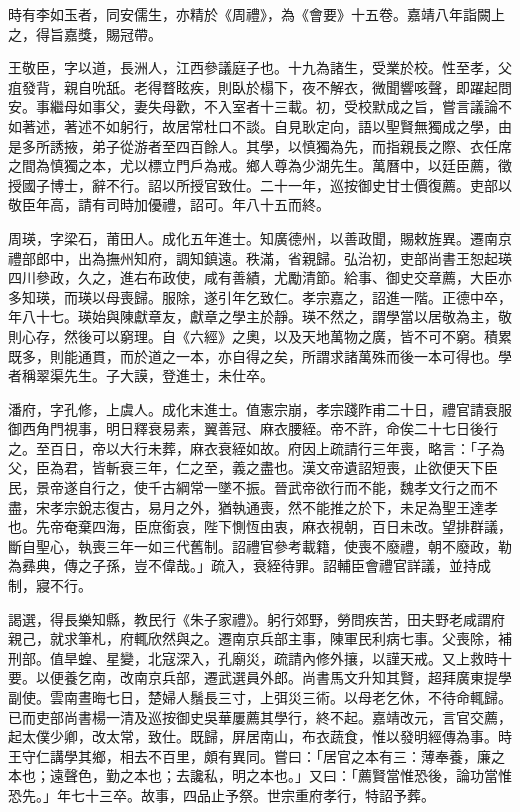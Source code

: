 \begin{pinyinscope}
時有李如玉者，同安儒生，亦精於《周禮》，為《會要》十五卷。嘉靖八年詣闕上之，得旨嘉獎，賜冠帶。

王敬臣，字以道，長洲人，江西參議庭子也。十九為諸生，受業於校。性至孝，父疽發背，親自吮舐。老得瞀眩疾，則臥於榻下，夜不解衣，微聞響咳聲，即躍起問安。事繼母如事父，妻失母歡，不入室者十三載。初，受校默成之旨，嘗言議論不如著述，著述不如躬行，故居常杜口不談。自見耿定向，語以聖賢無獨成之學，由是多所誘掖，弟子從游者至四百餘人。其學，以慎獨為先，而指親長之際、衣任席之間為慎獨之本，尤以標立門戶為戒。鄉人尊為少湖先生。萬曆中，以廷臣薦，徵授國子博士，辭不行。詔以所授官致仕。二十一年，巡按御史甘士價復薦。吏部以敬臣年高，請有司時加優禮，詔可。年八十五而終。

周瑛，字梁石，莆田人。成化五年進士。知廣德州，以善政聞，賜敕旌異。遷南京禮部郎中，出為撫州知府，調知鎮遠。秩滿，省親歸。弘治初，吏部尚書王恕起瑛四川參政，久之，進右布政使，咸有善績，尤勵清節。給事、御史交章薦，大臣亦多知瑛，而瑛以母喪歸。服除，遂引年乞致仁。孝宗嘉之，詔進一階。正德中卒，年八十七。瑛始與陳獻章友，獻章之學主於靜。瑛不然之，謂學當以居敬為主，敬則心存，然後可以窮理。自《六經》之奧，以及天地萬物之廣，皆不可不窮。積累既多，則能通貫，而於道之一本，亦自得之矣，所謂求諸萬殊而後一本可得也。學者稱翠渠先生。子大謨，登進士，未仕卒。

潘府，字孔修，上虞人。成化末進士。值憲宗崩，孝宗踐阼甫二十日，禮官請衰服御西角門視事，明日釋衰易素，翼善冠、麻衣腰絰。帝不許，命俟二十七日後行之。至百日，帝以大行未葬，麻衣衰絰如故。府因上疏請行三年喪，略言：「子為父，臣為君，皆斬衰三年，仁之至，義之盡也。漢文帝遺詔短喪，止欲便天下臣民，景帝遂自行之，使千古綱常一墜不振。晉武帝欲行而不能，魏孝文行之而不盡，宋孝宗銳志復古，易月之外，猶執通喪，然不能推之於下，未足為聖王達孝也。先帝奄棄四海，臣庶銜哀，陛下惻恆由衷，麻衣視朝，百日未改。望排群議，斷自聖心，執喪三年一如三代舊制。詔禮官參考載籍，使喪不廢禮，朝不廢政，勒為彞典，傳之子孫，豈不偉哉。」疏入，衰絰待罪。詔輔臣會禮官詳議，並持成制，寢不行。

謁選，得長樂知縣，教民行《朱子家禮》。躬行郊野，勞問疾苦，田夫野老咸謂府親己，就求筆札，府輒欣然與之。遷南京兵部主事，陳軍民利病七事。父喪除，補刑部。值旱蝗、星變，北寇深入，孔廟災，疏請內修外攘，以謹天戒。又上救時十要。以便養乞南，改南京兵部，遷武選員外郎。尚書馬文升知其賢，超拜廣東提學副使。雲南晝晦七日，楚婦人鬚長三寸，上弭災三術。以母老乞休，不待命輒歸。已而吏部尚書楊一清及巡按御史吳華屢薦其學行，終不起。嘉靖改元，言官交薦，起太僕少卿，改太常，致仕。既歸，屏居南山，布衣蔬食，惟以發明經傳為事。時王守仁講學其鄉，相去不百里，頗有異同。嘗曰：「居官之本有三：薄奉養，廉之本也；遠聲色，勤之本也；去讒私，明之本也。」又曰：「薦賢當惟恐後，論功當惟恐先。」年七十三卒。故事，四品止予祭。世宗重府孝行，特詔予葬。


\end{pinyinscope}
